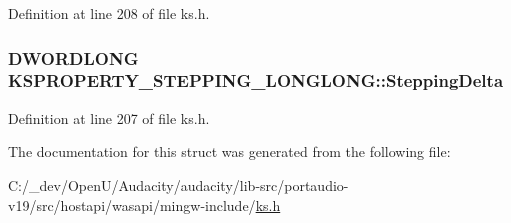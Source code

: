Definition at line 208 of file ks.\+h.

\subsubsection[{\texorpdfstring{Stepping\+Delta}{SteppingDelta}}]{\setlength{\rightskip}{0pt plus 5cm}D\+W\+O\+R\+D\+L\+O\+NG K\+S\+P\+R\+O\+P\+E\+R\+T\+Y\+\_\+\+S\+T\+E\+P\+P\+I\+N\+G\+\_\+\+L\+O\+N\+G\+L\+O\+N\+G\+::\+Stepping\+Delta}\hypertarget{struct_k_s_p_r_o_p_e_r_t_y___s_t_e_p_p_i_n_g___l_o_n_g_l_o_n_g_a9f5d9e76c5beb4077bc5d78deb5cdcc0}{}\label{struct_k_s_p_r_o_p_e_r_t_y___s_t_e_p_p_i_n_g___l_o_n_g_l_o_n_g_a9f5d9e76c5beb4077bc5d78deb5cdcc0}


Definition at line 207 of file ks.\+h.



The documentation for this struct was generated from the following file\+:\begin{DoxyCompactItemize}
\item 
C\+:/\+\_\+dev/\+Open\+U/\+Audacity/audacity/lib-\/src/portaudio-\/v19/src/hostapi/wasapi/mingw-\/include/\hyperlink{ks_8h}{ks.\+h}\end{DoxyCompactItemize}
